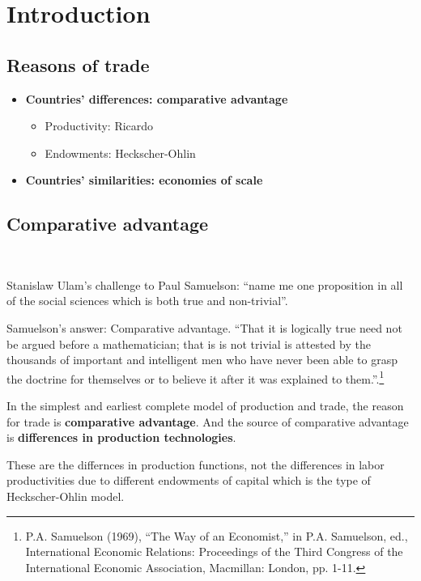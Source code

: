 \section{Introduction}

\subsection{Reasons of trade}
\begin{itemize}
    \item \textbf{Countries' differences: comparative advantage}
    \begin{itemize}
        \item Productivity: Ricardo
        \item Endowments: Heckscher-Ohlin
    \end{itemize}
    \item \textbf{Countries' similarities: economies of scale}
\end{itemize}

\subsection{Comparative advantage}
\begin{note}
    \

    Stanislaw Ulam's challenge to Paul Samuelson:  ``name me one
proposition in all of the social sciences which is both true and
non-trivial''. 

Samuelson's answer: Comparative advantage. ``That it is logically true need not be
argued before a mathematician; that is is not trivial is attested by
the thousands of important and intelligent men who have never
been able to grasp the doctrine for themselves or to believe it after
it was explained to them.''.\footnote{P.A. Samuelson (1969), ``The Way of an Economist,'' 
in P.A. Samuelson, ed., International Economic Relations: Proceedings of the Third Congress of the
International Economic Association, Macmillan: London, pp. 1-11.}
\end{note}

In the simplest and earliest complete model of production and trade,
the reason for trade is \textbf{comparative advantage}.
And the source of comparative advantage is \textbf{differences in production technologies}.

These are the differnces in production functions, not the differences
in labor productivities due to different endowments of capital which is the type of 
Heckscher-Ohlin model.

